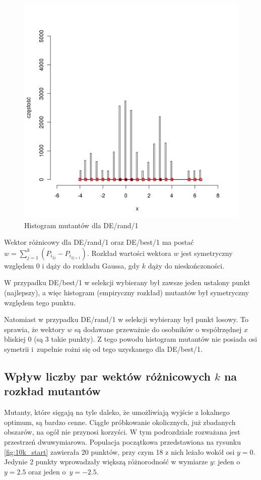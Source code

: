 \documentclass[a4paper,onecolumn,oneside,12pt,wide,floatssmall]{mwrep}
\theoremstyle{definition}
\theoremstyle{plain}%
\theoremstyle{remark}
\begin{document}
\begin{figure}[H]
\centering
\includegraphics[width=.65\textwidth]{img/rand}
\caption{Histogram mutantów dla DE/rand/1} 
\label{fig:sym_rand}
\end{figure}


Wektor różnicowy dla DE/rand/1 oraz DE/best/1 ma postać $w = \sum\limits_{j=1}^k (P_{i_{2j}} - P_{i_{2j+1}})$. 
Rozkład wartości wektora $w$ jest symetryczny względem 0 i dąży do rozkładu Gaussa, gdy $k$ dąży do 
nieskończoności.

W przypadku DE/best/1 w selekcji wybierany był zawsze jeden ustalony punkt (najlepszy), 
a więc histogram (empiryczny rozkład) mutantów był symetryczny względem tego punktu.

Natomiast w przypadku DE/rand/1
w selekcji wybierany był punkt losowy. To sprawia, że wektory $w$ są dodawane
przeważnie do osobników o współrzędnej $x$ bliskiej 0 (są 3 takie punkty).
Z tego powodu histogram mutantów nie posiada osi symetrii i~zupełnie rożni się od tego uzyskanego dla DE/best/1.

\subsection{Wpływ liczby par wektów różnicowych $k$ na rozkład mutantów}

Mutanty, które sięgają
na tyle daleko, że umożliwiają wyjście z lokalnego optimum, są bardzo cenne. 
Ciągłe próbkowanie okolicznych, już zbadanych obszarów, na ogół nie przynosi korzyści.
W tym podrozdziale rozważana jest przestrzeń dwuwymiarowa.
Populacja początkowa przedstawiona na rysunku \ref{fig:10k_start} zawierała 20 punktów, 
przy czym 18 z nich leżało wokół osi $y = 0$. 
Jedynie 2 punkty wprowadzały większą różnorodność 
w wymiarze $y$: jeden o $y = 2.5$ oraz jeden o~$y = -2.5$. 
\end{document}
